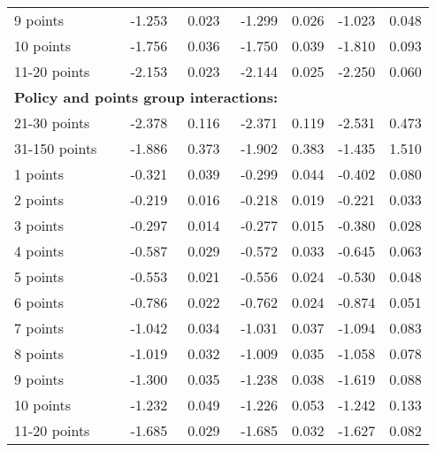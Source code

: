 \begin{table}
\begin{tabular}{l r r r r r r}
9 points  & -1.253  &  0.023  & -1.299  &  0.026  & -1.023  &  0.048   \\ 
 
10 points  & -1.756  &  0.036  & -1.750  &  0.039  & -1.810  &  0.093   \\ 
 
11-20 points  & -2.153  &  0.023  & -2.144  &  0.025  & -2.250  &  0.060   \\ 
 

\hline 
 
\multicolumn{4}{l}{\textbf{Policy and points group interactions:}}  \\ 
 
21-30 points  & -2.378  &  0.116  & -2.371  &  0.119  & -2.531  &  0.473   \\ 
 
31-150 points  & -1.886  &  0.373  & -1.902  &  0.383  & -1.435  &  1.510   \\ 
 
1 points  & -0.321  &  0.039  & -0.299  &  0.044  & -0.402  &  0.080   \\ 
 
2 points  & -0.219  &  0.016  & -0.218  &  0.019  & -0.221  &  0.033   \\ 
 
3 points  & -0.297  &  0.014  & -0.277  &  0.015  & -0.380  &  0.028   \\ 
 
4 points  & -0.587  &  0.029  & -0.572  &  0.033  & -0.645  &  0.063   \\ 
 
5 points  & -0.553  &  0.021  & -0.556  &  0.024  & -0.530  &  0.048   \\ 
 
6 points  & -0.786  &  0.022  & -0.762  &  0.024  & -0.874  &  0.051   \\ 
 
7 points  & -1.042  &  0.034  & -1.031  &  0.037  & -1.094  &  0.083   \\ 
 
8 points  & -1.019  &  0.032  & -1.009  &  0.035  & -1.058  &  0.078   \\ 
 
9 points  & -1.300  &  0.035  & -1.238  &  0.038  & -1.619  &  0.088   \\ 
 
10 points  & -1.232  &  0.049  & -1.226  &  0.053  & -1.242  &  0.133   \\ 
 
11-20 points  & -1.685  &  0.029  & -1.685  &  0.032  & -1.627  &  0.082   \\ 
 

\end{tabular}
\end{table}
